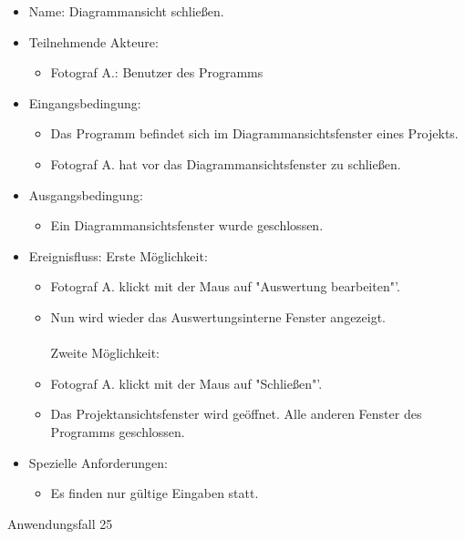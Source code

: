 \begin{itemize}
\item Name: Diagrammansicht schließen.
\item Teilnehmende Akteure:
\begin{itemize}
\item Fotograf A.: Benutzer des Programms
\end{itemize}
\item Eingangsbedingung:
\begin{itemize}
\item Das Programm befindet sich im Diagrammansichtsfenster eines Projekts.
\item Fotograf A. hat vor das Diagrammansichtsfenster zu schließen.
\end{itemize}
\item Ausgangsbedingung:
\begin{itemize}
\item Ein Diagrammansichtsfenster wurde geschlossen.
\end{itemize}
\item Ereignisfluss:
Erste Möglichkeit:
\begin{itemize}
\item Fotograf A. klickt mit der Maus auf "Auswertung bearbeiten"'.
\item Nun wird wieder das Auswertungsinterne Fenster angezeigt.\\\\Zweite Möglichkeit:\\
\item Fotograf A. klickt mit der Maus auf "Schließen"'.
\item Das Projektansichtsfenster wird geöffnet. Alle anderen Fenster des Programms geschlossen.
\end{itemize}
\item Spezielle Anforderungen:
\begin{itemize}
\item Es finden nur gültige Eingaben statt.
\end{itemize}
\end{itemize}

\begin{description}
\item[Anwendungsfall 25]
\end{description}
 
